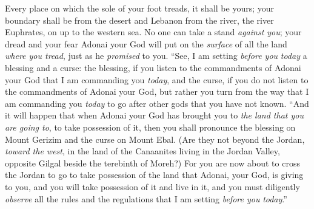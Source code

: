 \begin{biblechapter}
\verse Every place on which the sole of your foot treads, it shall be yours; your boundary shall be from the desert and Lebanon from the river, the river Euphrates, on up to the western sea.
\verse No one can take a stand \textit{against you}; your dread and your fear Adonai your God will put on the \textit{surface} of all the land \textit{where you tread}, just as he \textit{promised} to you.
\verse “See, I am setting \textit{before you} \textit{today} a blessing and a curse:
\verse the blessing, if you listen to the commandments of Adonai your God that I am commanding you \textit{today},
\verse and the curse, if you do not listen to the commandments of Adonai your God, but rather you turn from the way that I am commanding you \textit{today} to go after other gods that you have not known.
\verse “And it will happen that when Adonai your God has brought you to \textit{the land that you are going to}, to take possession of it, then you shall pronounce the blessing on Mount Gerizim and the curse on Mount Ebal.
\verse (Are they not beyond the Jordan, \textit{toward the west}, in the land of the Canaanites living in the Jordan Valley, opposite Gilgal beside the terebinth of Moreh?)
\verse For you are now about to cross the Jordan to go to take possession of the land that Adonai, your God, is giving to you, and you will take possession of it and live in it,
\verse and you must diligently \textit{observe} all the rules and the regulations that I am setting \textit{before you} \textit{today}.”
\end{biblechapter}

